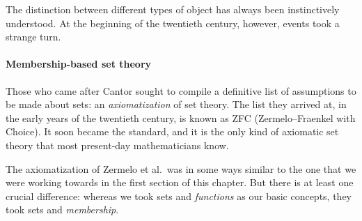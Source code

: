 The distinction between different types of object has always been
instinctively understood.  At the beginning of the twentieth century, however,
events took a strange turn.

\paragraph*{Membership-based set theory}
%
%
Those who came after Cantor sought to compile a definitive list of
assumptions to be made about sets: an \emph{axiomatization} of set theory.
The list they arrived at, in the early years of the twentieth century, is known
as ZFC%
%
%
(Zermelo--Fraenkel with Choice).  It soon became the standard, and
it is the only kind of axiomatic set theory that most present-day
mathematicians know.

The axiomatization of Zermelo et al.\ was in some ways similar to the one
that we were working towards in the first section of this chapter.  But
there is at least one crucial difference: whereas we took sets and
\emph{functions} as our basic concepts, they took sets and
\emph{membership}.

